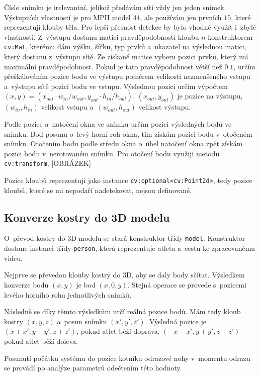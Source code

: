 Číslo snímku je irelevantní, jelikož předávám síti vždy jen jeden snímek. Výstupních vlastností je pro MPII model $44$, ale používám jen prvních $15$, které reprezentují klouby těla. Pro lepší přesnost detekce by bylo vhodné využít i~zbylé vlastnosti. Z~výstupu dostanu matici pravděpodobností kloubu $n$ konstruktorem \texttt{cv\::Mat}, kterému dám výšku, šířku, typ prvků a~ukazatel na výslednou matici, který dostanu z~výstupu sítě. Ze získané matice vyberu pozici prvku, který má maximální pravděpodobnost. Pokud je tato pravděpodobnost větší než $0.1$, určím přeškálováním pozice bodu ve výstupu poměrem velikosti nezmenšeného vstupu a~výstupu sítě pozici bodu ve vstupu. Výslednou pozici určím výpočtem $(x,y)=(x_{out}\cdot w_{in}/w_{out}, y_{out}\cdot h_{in}/h_{out})$. $(x_{out},y_{out})$ je pozice na výstupu, $(w_{in},h_{in})$ velikost vstupu a~$(w_{out},h_{out})$ velikost výstupu.

Podle pozice a~natočení okna ve snímku určím pozici výsledných bodů ve snímku. Bod posunu o~levý horní roh okna, tím získám pozici bodu v~otočeném snímku. Otočením bodu podle středu okna o~úhel natočení okna zpět získám pozici bodu v~nerotovaném snímku. Pro otočení bodu využiji metodu \texttt{cv\::transform}. [OBRÁZEK]

Pozice kloubů reprezentuji jako instance \texttt{cv\::optional<cv\::Point2d>}, tedy pozice kloubů, které se mi nepodaří nadetekovat, nejsou definované.



\subsection{Konverze kostry do 3D modelu}

O~převod kostry do 3D modelu se stará konstruktor třídy \texttt{model}. Konstruktor dostane instanci třídy \texttt{person}, která reprezentuje atleta a~cestu ke zpracovanému videu.

Nejprve se převedou klouby kostry do 3D, aby se daly body sčítat. Výsledkem konverze bodu $(x,y)$ je bod $(x,0,y)$. Stejná operace se provede s~pozicemi levého horního rohu jednotlivých snímků.

Následně se díky těmto výsledkům určí reálná pozice bodů. Mám tedy kloub kostry $(x,y,z)$ a~posun snímku $(x',y',z')$. Výsledná pozice je $(x+x',y+y',z+z')$, pokud atlet běží doprava, $(-x-x',y+y',z+z')$ pokud atlet běží doleva.

Posunutí počátku systému do pozice kotníku odrazové nohy v~momentu odrazu se provádí po analýze parametrů odečtením této hodnoty.



